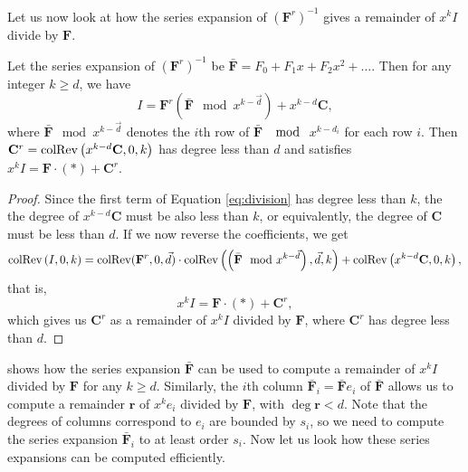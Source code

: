 Let us now look at how the series expansion of $\left(\mathbf{F}^{r}\right)^{-1}$
gives a remainder of $x^{k}I$ divide by $\mathbf{F}$.
\begin{lem}
\label{lem:remainder}Let \textup{the series expansion of $\left(\mathbf{F}^{r}\right)^{-1}$
be }$\bar{\mathbf{F}}=F_{0}+F_{1}x+F_{2}x^{2}+\dots$. Then for any
integer $k\ge d$, we have 
\begin{equation}
I=\mathbf{F}^{r}\left(\bar{\mathbf{F}}\mod x^{k-\vec{d}}\right)+x^{k-d}\mathbf{C},\label{eq:division}
\end{equation}
where $\bar{\mathbf{F}}\mod x^{k-\vec{d}}$ denotes the $i$th row
of $\bar{\mathbf{F}}$ $\mod$ $x^{k-d_{i}}$ for each row $i$. Then
$\mathbf{C}^{r}=\operatorname{colRev}\left(x^{k-d}\mathbf{C},0,k\right)$ has degree
less than $d$ and satisfies \textup{$x^{k}I=\mathbf{F}\cdot\left(*\right)+\mathbf{C}^{r}$.}\end{lem}
\begin{proof}
Since the first term of Equation \eqref{eq:division} has degree less
than $k$, the the degree of $x^{k-d}\mathbf{C}$ must be also less
than $k$, or equivalently, the degree of $\mathbf{C}$ must be less
than $d$. If we now reverse the coefficients, we get 
\[
\operatorname{colRev}\left(I,0,k\right)=\operatorname{colRev}(\mathbf{F}^{r},0,\vec{d})\cdot\operatorname{colRev}\left(\left(\bar{\mathbf{F}}\mod x^{k-\vec{d}}\right),\vec{d},k\right)+\operatorname{colRev}\left(x^{k-d}\mathbf{C},0,k\right),
\]
 that is, 
\[
x^{k}I=\mathbf{F}\cdot\left(*\right)+\mathbf{C}^{r},
\]
 which gives us $\mathbf{C}^{r}$ as a remainder of $x^{k}I$ divided
by $\mathbf{F}$, where $\mathbf{C}^{r}$ has degree less than $d$. 
\end{proof}
 shows how the series expansion $\bar{\mathbf{F}}$
can be used to compute a remainder of $x^{k}I$ divided by $\mathbf{F}$
for any $k\ge d$. Similarly, the $i$th column $\bar{\mathbf{F}}_{i}=\bar{\mathbf{F}}e_{i}$
of $\bar{\mathbf{F}}$ allows us to compute a remainder $\mathbf{r}$
of $x^{k}e_{i}$ divided by $\mathbf{F}$, with $\deg\mathbf{r}<d$.
Note that the degrees of columns correspond to $e_{i}$ are bounded
by $s_{i}$, so we need to compute the series expansion $\bar{\mathbf{F}}_{i}$
to at least order $s_{i}$. Now let us look how these series expansions
can be computed efficiently.


